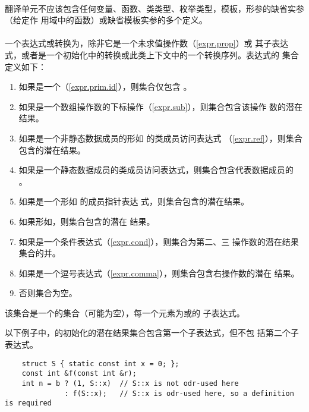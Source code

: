 \paragraph{} %
翻译单元不应该包含任何变量、函数、类类型、枚举类型，模板，形参的缺省实参（给定作
用域中的函数）或缺省模板实参的多个定义。

\paragraph{} %
一个表达式或转换为，除非它是一个未求值操作数（\ref{expr.prop}）或
其子表达式，或者是一个初始化中的转换或此类上下文中的一个转换序列。表达式的
集合定义如下：
\begin{enumerate}
  \item 如果是一个（\ref{expr.prim.id}），则集合仅包含
        。
  \item 如果是一个数组操作数的下标操作（\ref{expr.sub}），则集合包含该操作
        数的潜在结果。
  \item 如果是一个非静态数据成员的形如 
        的类成员访问表达式
        （\ref{expr.ref}），则集合包含的潜在结果。
  \item 如果是一个静态数据成员的类成员访问表达式，则集合包含代表数据成员的
        。
  \item 如果是一个形如  的成员指针表达
        式，则集合包含的潜在结果。
  \item 如果形如\tm{(}\tm{)}，则集合包含的潜在
        结果。
  \item 如果是一个\lvalue{}条件表达式（\ref{expr.cond}），则集合为第二、三
        操作数的潜在结果集合的并。
  \item 如果是一个逗号表达式（\ref{expr.comma}），则集合包含右操作数的潜在
        结果。
  \item 否则集合为空。
\end{enumerate}
\begin{note} %
  该集合是一个的集合（可能为空），每一个元素为或的
  子表达式。

  \begin{example} %
    以下例子中，的初始化的潜在结果集合包含第一个子表达式，但不包
    括第二个子表达式。
    \begin{lstlisting}
    struct S { static const int x = 0; };
    const int &f(const int &r);
    int n = b ? (1, S::x)  // S::x is not odr-used here
              : f(S::x);   // S::x is odr-used here, so a definition is required
    \end{lstlisting}
  \end{example}

\end{note}

